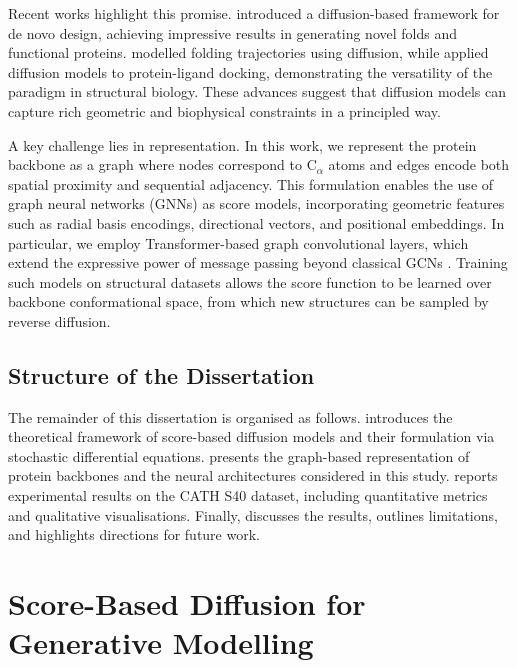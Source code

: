 \documentclass[a4paper,12pt]{article}
\begin{document}
Recent works highlight this promise. \citet{watsonNovoDesignProtein2023} introduced a diffusion-based framework for de novo design, achieving impressive results in generating novel folds and functional proteins. \citet{wuProteinStructureGeneration2024} modelled folding trajectories using diffusion, while \citet{yimDiffusionModelsProtein2024} applied diffusion models to protein-ligand docking, demonstrating the versatility of the paradigm in structural biology. These advances suggest that diffusion models can capture rich geometric and biophysical constraints in a principled way.

A key challenge lies in representation. In this work, we represent the protein backbone as a graph where nodes correspond to C\(_\alpha\) atoms and edges encode both spatial proximity and sequential adjacency. This formulation enables the use of graph neural networks (GNNs) \citep{scarselliGraphNeuralNetwork2009,gilmer2017NeuralMessagePassing} as score models, incorporating geometric features such as radial basis encodings, directional vectors, and positional embeddings. In particular, we employ Transformer-based graph convolutional layers, which extend the expressive power of message passing beyond classical GCNs \citep{kipf2017SemiSupervisedClassificationGraph}. Training such models on structural datasets allows the score function to be learned over backbone conformational space, from which new structures can be sampled by reverse diffusion.

\subsection{Structure of the Dissertation}
The remainder of this dissertation is organised as follows.  introduces the theoretical framework of score-based diffusion models and their formulation via stochastic differential equations.  presents the graph-based representation of protein backbones and the neural architectures considered in this study.  reports experimental results on the CATH S40 dataset, including quantitative metrics and qualitative visualisations. Finally,  discusses the results, outlines limitations, and highlights directions for future work.

\clearpage

\section{Score-Based Diffusion for Generative Modelling}\label{sec:SBD}
\end{document}
